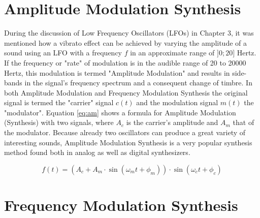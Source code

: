\documentclass[12pt,twoside]{report}
\begin{document}
\section{Amplitude Modulation Synthesis}

During the discussion of Low Frequency Oscillators (LFOs) in Chapter 3, it was mentioned how a vibrato effect can be achieved by varying the amplitude of a sound using an LFO with a frequency $f$ in an approximate range of $]0;20]$ Hertz. If the frequency or "rate" of modulation is in the audible range of 20 to 20000 Hertz, this modulation is termed "Amplitude Modulation" and results in side-bands in the signal's frequency spectrum and a consequent change of timbre. In both Amplitude Modulation and Frequency Modulation Synthesis the original signal is termed the "carrier" signal $c(t)$ and the modulation signal $m(t)$ the "modulator". Equation \ref{eq:am} shows a formula for Amplitude Modulation (Synthesis) with two signals, where $A_{c}$ is the carrier's amplitude and $A_{m}$ that of the modulator. Because already two oscillators can produce a great variety of interesting sounds, Amplitude Modulation Synthesis is a very popular synthesis method found both in analog as well as digital synthesizers.

\begin{equation}
  f(t) = (A_{c} + A_{m}\cdot\sin(\omega_{m} t + \phi_{m}))\cdot\sin(\omega_{c} t + \phi_{c})
  \label{eq:am}
\end{equation}

\section{Frequency Modulation Synthesis}
\end{document}
